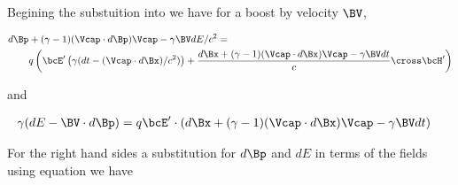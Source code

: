 %
%
%
%
%
%
%
%

Begining the substuition into  we have for a boost by velocity \(\BV\),

\begin{equation}\label{eqn:lorentz_force_tx_2:20}
\begin{aligned}
d\Bp &+ (\gamma-1)(\Vcap \cdot d\Bp) \Vcap - \gamma \BV dE/c^2 = \\
&q \left( \bcE' \left(\gamma ( dt - (\Vcap \cdot d\Bx )/c^2 )\right) + \frac{d\Bx + (\gamma-1)(\Vcap \cdot d\Bx) \Vcap - \gamma \BV dt}{c} \cross \bcH' \right)  \\
\end{aligned}
\end{equation}

and

\begin{equation}\label{eqn:lorentz_force_tx_2:40}
\begin{aligned}
\gamma ( dE - \BV \cdot d\Bp ) &= q \bcE' \cdot \left(d\Bx + (\gamma-1)(\Vcap \cdot d\Bx) \Vcap - \gamma \BV dt\right)
\end{aligned}
\end{equation}

For the right hand sides a substitution for \(d\Bp\) and \(dE\) in terms of the fields using equation
 we have


